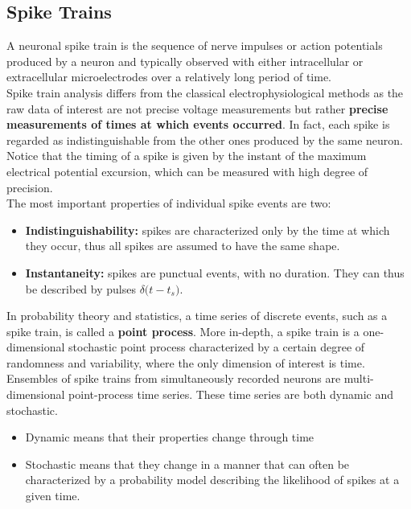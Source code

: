 \subsection{Spike Trains}
A neuronal spike train is the sequence of nerve impulses or action
potentials produced by a neuron and typically observed with either
intracellular or extracellular microelectrodes over a relatively long
period of time.\\
Spike train analysis differs from the classical electrophysiological methods
as the raw data of interest are not precise voltage measurements but
rather \textbf{precise measurements of times at which events occurred}. In
fact, each spike is regarded as indistinguishable from the other ones produced by
the same neuron. Notice that the timing of a spike is given by the instant
of the maximum electrical potential excursion, which can be measured with
high degree of precision.\\
The most important properties of individual spike events are two:
\begin{itemize}
      \item \textbf{Indistinguishability:} spikes are characterized only by the
            time at which they occur, thus all spikes are assumed to have the same shape.
      \item \textbf{Instantaneity:} spikes are punctual events, with no duration.
            They can thus be described by pulses \(\delta\bigl(t-t_s\bigr)\).
\end{itemize}
In probability theory and statistics, a time series of discrete events,
such as a spike train, is called a \textbf{point process}. More
in-depth, a spike train is a one-dimensional stochastic point process characterized by a
certain degree of randomness and variability, where the only dimension of
interest is time.\\
Ensembles of spike trains from simultaneously recorded neurons are multi-
dimensional point-process time series. These time series are both dynamic
and stochastic.
\begin{itemize}
      \item Dynamic means that their properties change through time
      \item Stochastic means that they change in a manner that can often be
            characterized by a probability model describing the likelihood of spikes
            at a given time.
\end{itemize}

